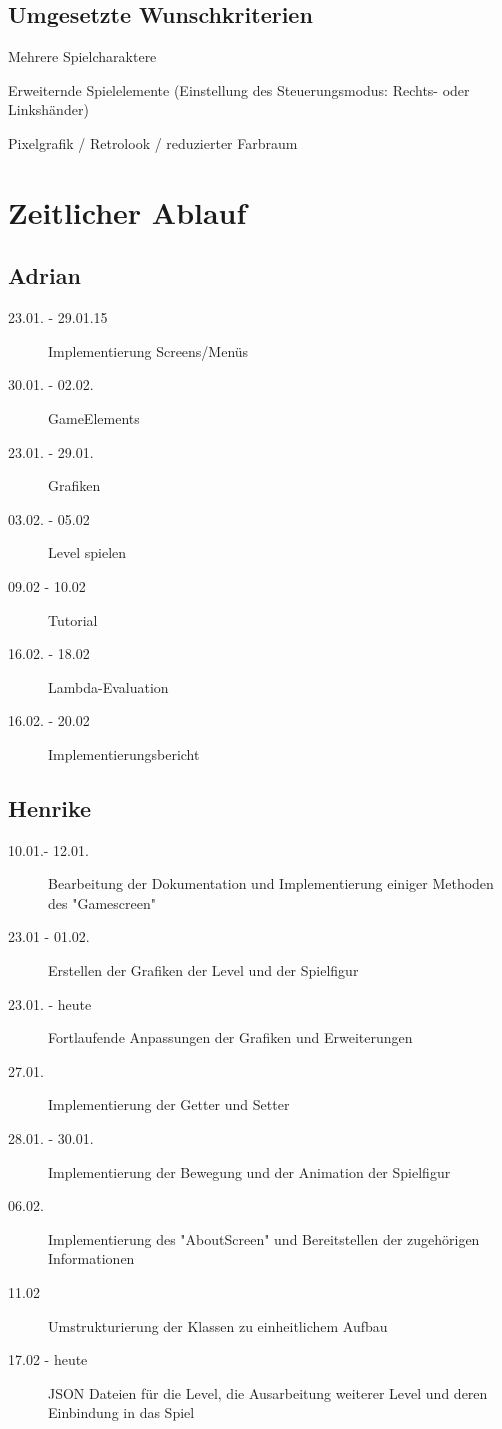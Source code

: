 \documentclass[parskip=full]{scrreprt}
\begin{document}
\section{Umgesetzte Wunschkriterien}

\begin{description}
	\item Mehrere Spielcharaktere
	\item Erweiternde Spielelemente (Einstellung des Steuerungsmodus: Rechts- oder Linkshänder)
	\item Pixelgrafik / Retrolook / reduzierter Farbraum
\end{description}

\chapter{Zeitlicher Ablauf}

\section{Adrian}

\begin{description}
	\item[23.01. - 29.01.15] Implementierung Screens/Menüs
	\item[30.01. - 02.02.] GameElements
	\item[23.01. - 29.01.] Grafiken
	\item[03.02. - 05.02] Level spielen
	\item[09.02 - 10.02] Tutorial
	\item[16.02. - 18.02] Lambda-Evaluation
	\item[16.02. - 20.02] Implementierungsbericht
\end{description}

\section{Henrike}
\begin{description}
	\item[10.01.- 12.01.]
	Bearbeitung der Dokumentation und Implementierung einiger Methoden des "Gamescreen"
	\item[23.01 - 01.02.]
	Erstellen der Grafiken der Level und der Spielfigur
	\item[23.01. - heute]
	Fortlaufende Anpassungen der Grafiken und Erweiterungen
	\item[27.01.]
	Implementierung der Getter und Setter
	\item[28.01. - 30.01.]
	Implementierung der Bewegung und der Animation der Spielfigur
	\item[06.02.]
	Implementierung des "AboutScreen" und Bereitstellen der zugehörigen Informationen
	\item[11.02]
	Umstrukturierung der Klassen zu einheitlichem Aufbau
	\item[17.02 - heute]
	JSON Dateien für die Level, die Ausarbeitung weiterer Level und deren Einbindung in das Spiel 
\end{description}
\end{document}
